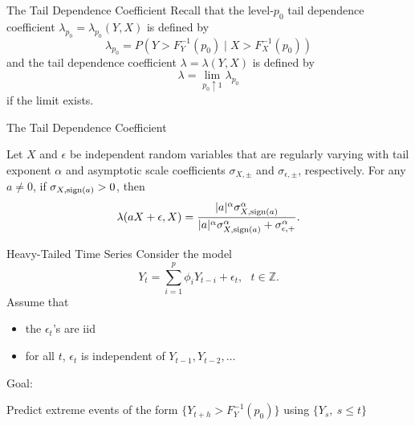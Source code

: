 \documentclass{beamer}
\def\Z{{\mathbb Z}}
\def\sign{{\rm sign}}
\begin{document}
    
        

\begin{frame}{The Tail Dependence Coefficient}
    Recall that the level-$p_0$ tail dependence coefficient $\lambda_{p_0} = \lambda_{p_0}(Y, X)$ is defined by
    \[
    \lambda_{p_0} = P(Y > F_Y^{-1}(p_0) \mid X > F_X^{-1}(p_0))
    \]
    and the tail dependence coefficient $\lambda = \lambda(Y, X)$ is defined by
    \[
    \lambda = \lim_{p_0 \uparrow 1} \lambda_{p_0}
    \]
    if the limit exists.
\end{frame}

\begin{frame}{The Tail Dependence Coefficient}
    \begin{lemma}\label{lem:lambda_lem}
        Let $X$ and $\epsilon$ be independent random variables that are regularly varying with tail exponent $\alpha$ and asymptotic scale coefficients $\sigma_{X, \pm}$ and $\sigma_{\epsilon, \pm}$, respectively. For any $a \ne 0$, if $\sigma_{X, \sign(a)} > 0$, then
        \[
        \lambda(a X + \epsilon, X) = \frac{|a|^\alpha \sigma_{X, \sign(a)}^\alpha}{|a|^\alpha \sigma_{X, \sign(a)}^\alpha + \sigma_{\epsilon, +}^\alpha}.
        \]
    \end{lemma}
\end{frame}

\begin{frame}{Heavy-Tailed Time Series}
    Consider the model
    \begin{equation}\label{e:Y_t}
        Y_t  = \sum_{i=1}^{p} \phi_i Y_{t-i} + \epsilon_t,\ \ \ t\in \Z.
    \end{equation}
    Assume that
    \begin{itemize}
        \item the $\epsilon_t$'s are iid
        \item for all $t$, $\epsilon_t$ is independent of $Y_{t - 1}, Y_{t - 2}, \ldots$
    \end{itemize}

    \medskip

    Goal:
    \begin{center}
        Predict extreme events of the form $\{Y_{t + h} > F_Y^{-1}(p_0)\}$ using $\{Y_s, \ s \le t\}$    
    \end{center}
\end{frame}
\end{document}
